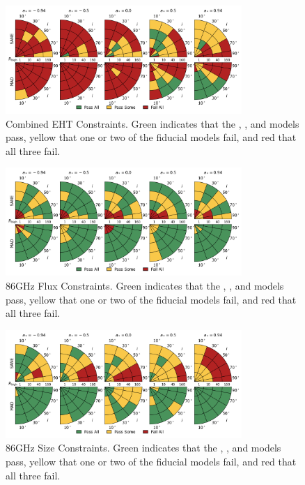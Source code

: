 \begin{figure}
  \centering
  \includegraphics[width=0.8\textwidth]{./figures/Interferometric_Constraints.png}
  \caption{Combined EHT Constraints.  Green indicates that the \kharma, \bhac, and \hamr models pass, yellow that one or two of the fiducial models fail, and red that all three fail.}
  \label{fig:eht_comb_pizza}
\end{figure}


\begin{figure}
  \centering
  \includegraphics[width=0.8\textwidth]{./figures/86GHz_flux_Constraints.png}
  \caption{86GHz Flux Constraints.  Green indicates that the \kharma, \bhac, and \hamr models pass, yellow that one or two of the fiducial models fail, and red that all three fail.}
  \label{fig:86GHz_flux_pizza}
\end{figure}

\begin{figure}
  \centering
  \includegraphics[width=0.8\textwidth]{./figures/86GHz_size_Constraints.png}
  \caption{86GHz Size Constraints.  Green indicates that the \kharma, \bhac, and \hamr models pass, yellow that one or two of the fiducial models fail, and red that all three fail.}
  \label{fig:86GHz_size_pizza}
\end{figure}


